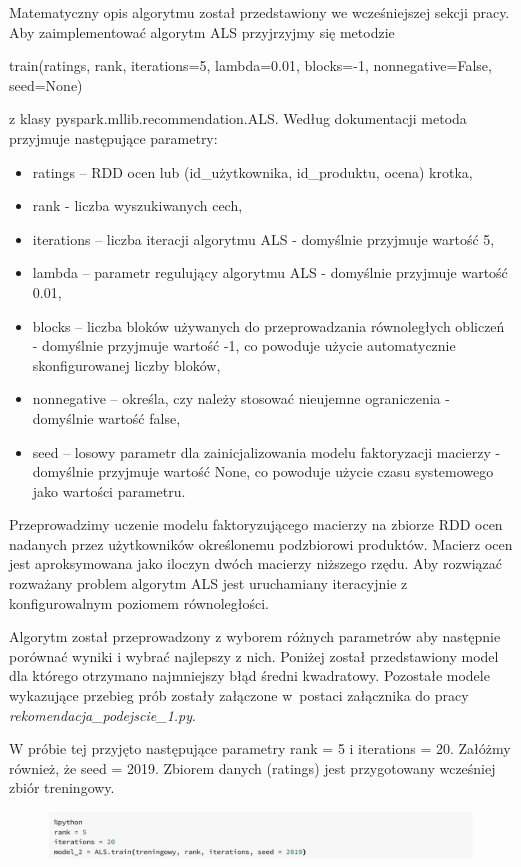 \documentclass[12pt,a4paper]{report}
\begin{document}
Matematyczny opis algorytmu został przedstawiony we wcześniejszej sekcji pracy.
Aby zaimplementować algorytm ALS przyjrzyjmy się metodzie 
\begin{center}
train(ratings, rank, iterations=5, lambda=0.01, blocks=-1, nonnegative=False, seed=None)
\end{center}
z klasy pyspark.mllib.recommendation.ALS. Według dokumentacji metoda przyjmuje następujące parametry:
\begin{itemize}
\item ratings – RDD ocen lub (id\_użytkownika, id\_produktu, ocena) krotka,
\item rank - liczba wyszukiwanych cech,
\item iterations – liczba iteracji algorytmu ALS - domyślnie przyjmuje wartość 5,
\item lambda – parametr regulujący algorytmu ALS - domyślnie przyjmuje wartość 0.01,
\item blocks – liczba bloków używanych do przeprowadzania równoległych obliczeń - domyślnie przyjmuje wartość -1, co powoduje użycie automatycznie skonfigurowanej liczby bloków,
\item nonnegative – określa, czy należy stosować nieujemne ograniczenia - domyślnie wartość false,
\item seed – losowy parametr dla zainicjalizowania modelu faktoryzacji macierzy - domyślnie przyjmuje wartość None, co powoduje użycie czasu systemowego jako wartości parametru.
\end{itemize}

Przeprowadzimy uczenie modelu faktoryzującego macierzy na zbiorze RDD ocen nadanych przez użytkowników określonemu podzbiorowi produktów. Macierz ocen jest aproksymowana jako iloczyn dwóch macierzy niższego rzędu. Aby rozwiązać rozważany problem algorytm ALS jest uruchamiany iteracyjnie z konfigurowalnym poziomem równoległości.

Algorytm został przeprowadzony z wyborem różnych parametrów aby następnie porównać wyniki i wybrać najlepszy z nich.
Poniżej został przedstawiony model dla którego otrzymano najmniejszy błąd średni kwadratowy.
Pozostałe modele wykazujące przebieg prób zostały załączone w~postaci załącznika do pracy \textit{rekomendacja\_podejscie\_1.py}. 

W próbie tej przyjęto następujące parametry rank = 5 i iterations = 20. Załóżmy również, że seed = 2019. Zbiorem danych (ratings) jest przygotowany wcześniej zbiór treningowy.

\begin{figure}[H]
\includegraphics[scale=0.5]{obrazy/ALS8.PNG} 
\end{figure}
\end{document}
